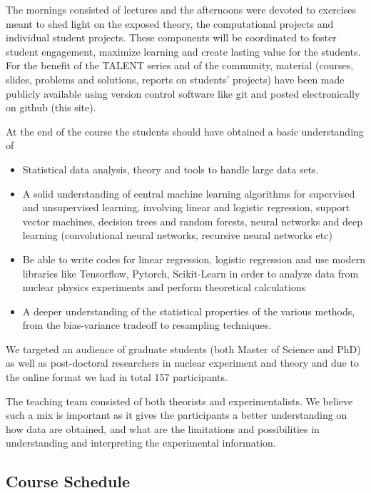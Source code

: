 \documentclass[prc,amsart,english]{revtex4}
\begin{document}
The mornings consisted of lectures and the afternoons were devoted to
exercises meant to shed light on the exposed theory, the computational
projects and individual student projects. These components will be
coordinated to foster student engagement, maximize learning and create
lasting value for the students. For the benefit of the TALENT series
and of the community, material (courses, slides, problems and
solutions, reports on students' projects) have  been made publicly
available using version control software like git and posted
electronically on github (this site).



At the end of the course the students should have obtained a basic understanding of

\begin{itemize}
\item Statistical data analysis, theory and tools to handle large data sets.\item A solid understanding of central machine learning algorithms for supervised and unsupervised learning, involving linear and logistic regression, support vector machines, decision trees and random forests, neural networks and deep learning (convolutional neural networks, recursive neural networks etc)
\item Be able to write codes for linear regression, logistic regression and use modern libraries like Tensorflow, Pytorch, Scikit-Learn in order to analyze data from nuclear physics experiments and perform theoretical calculations
\item A deeper understanding of the statistical properties of the various methods, from the bias-variance tradeoff to resampling techniques.
\end{itemize}

We targeted an audience of graduate students (both Master of Science
and PhD) as well as post-doctoral researchers in nuclear experiment
and theory and due to the online format we had in total 157 participants.

The teaching team consisted of both theorists and experimentalists. We
believe such a mix is important as it gives the participants a better
understanding on how data are obtained, and what are the limitations
and possibilities in understanding and interpreting the experimental
information.


\subsection{Course Schedule}
  
\end{document}
